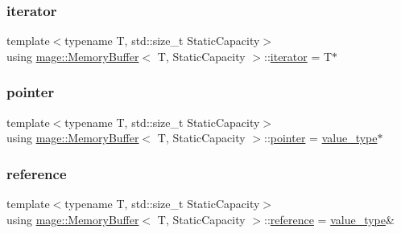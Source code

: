 \mbox{\label{classmage_1_1_memory_buffer_af487a5f5f07f8ba65e3a5d3a26d32b6c}} 
\subsubsection{\texorpdfstring{iterator}{iterator}}
{\footnotesize\ttfamily template$<$typename T, std\+::size\+\_\+t Static\+Capacity$>$ \\
using \mbox{\hyperlink{classmage_1_1_memory_buffer}{mage\+::\+Memory\+Buffer}}$<$ T, Static\+Capacity $>$\+::\mbox{\hyperlink{classmage_1_1_memory_buffer_af487a5f5f07f8ba65e3a5d3a26d32b6c}{iterator}} =  T$\ast$}

\mbox{\label{classmage_1_1_memory_buffer_a9ca6bfb07bbb3ce91ea703d3d6ec91e3}} 
\subsubsection{\texorpdfstring{pointer}{pointer}}
{\footnotesize\ttfamily template$<$typename T, std\+::size\+\_\+t Static\+Capacity$>$ \\
using \mbox{\hyperlink{classmage_1_1_memory_buffer}{mage\+::\+Memory\+Buffer}}$<$ T, Static\+Capacity $>$\+::\mbox{\hyperlink{classmage_1_1_memory_buffer_a9ca6bfb07bbb3ce91ea703d3d6ec91e3}{pointer}} =  \mbox{\hyperlink{classmage_1_1_memory_buffer_a3f8a036eaa59236b80342ba3a251c9e8}{value\+\_\+type}}$\ast$}

\mbox{\label{classmage_1_1_memory_buffer_ad28560f5391baac5dade220c99d9d62b}} 
\subsubsection{\texorpdfstring{reference}{reference}}
{\footnotesize\ttfamily template$<$typename T, std\+::size\+\_\+t Static\+Capacity$>$ \\
using \mbox{\hyperlink{classmage_1_1_memory_buffer}{mage\+::\+Memory\+Buffer}}$<$ T, Static\+Capacity $>$\+::\mbox{\hyperlink{classmage_1_1_memory_buffer_ad28560f5391baac5dade220c99d9d62b}{reference}} =  \mbox{\hyperlink{classmage_1_1_memory_buffer_a3f8a036eaa59236b80342ba3a251c9e8}{value\+\_\+type}}\&}

